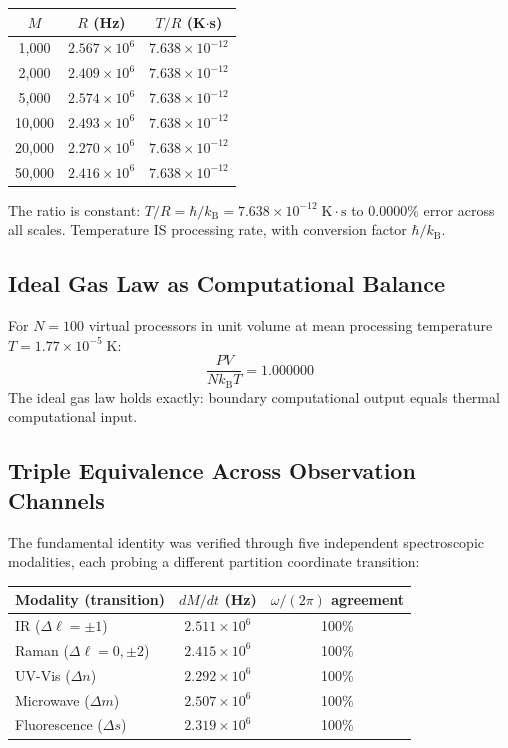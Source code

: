 \documentclass[twocolumn,10pt,a4paper]{article}
\theoremstyle{plain}
\theoremstyle{definition}
\theoremstyle{remark}
\newcommand{\kB}{k_{\mathrm{B}}}
\begin{document}
\begin{center}
\begin{tabular}{ccc}
\toprule
$M$ & $R$ (Hz) & $T/R$ (K$\cdot$s) \\
\midrule
1{,}000 & $2.567 \times 10^6$ & $7.638 \times 10^{-12}$ \\
2{,}000 & $2.409 \times 10^6$ & $7.638 \times 10^{-12}$ \\
5{,}000 & $2.574 \times 10^6$ & $7.638 \times 10^{-12}$ \\
10{,}000 & $2.493 \times 10^6$ & $7.638 \times 10^{-12}$ \\
20{,}000 & $2.270 \times 10^6$ & $7.638 \times 10^{-12}$ \\
50{,}000 & $2.416 \times 10^6$ & $7.638 \times 10^{-12}$ \\
\bottomrule
\end{tabular}
\end{center}

The ratio is constant: $T/R = \hbar/\kB = 7.638 \times 10^{-12}\;\mathrm{K \cdot s}$ to $0.0000\%$ error across all scales. Temperature IS processing rate, with conversion factor $\hbar/\kB$.

\subsection{Ideal Gas Law as Computational Balance}

For $N = 100$ virtual processors in unit volume at mean processing temperature $T = 1.77 \times 10^{-5}\;\mathrm{K}$:
\begin{equation}
    \frac{PV}{N\kB T} = 1.000000
\end{equation}
The ideal gas law holds exactly: boundary computational output equals thermal computational input.

\subsection{Triple Equivalence Across Observation Channels}

The fundamental identity was verified through five independent spectroscopic modalities, each probing a different partition coordinate transition:

\begin{center}
\begin{tabular}{lcc}
\toprule
Modality (transition) & $dM/dt$ (Hz) & $\omega/(2\pi)$ agreement \\
\midrule
IR ($\Delta\ell = \pm 1$) & $2.511 \times 10^6$ & 100\% \\
Raman ($\Delta\ell = 0, \pm 2$) & $2.415 \times 10^6$ & 100\% \\
UV-Vis ($\Delta n$) & $2.292 \times 10^6$ & 100\% \\
Microwave ($\Delta m$) & $2.507 \times 10^6$ & 100\% \\
Fluorescence ($\Delta s$) & $2.319 \times 10^6$ & 100\% \\
\bottomrule
\end{tabular}
\end{center}
\end{document}
